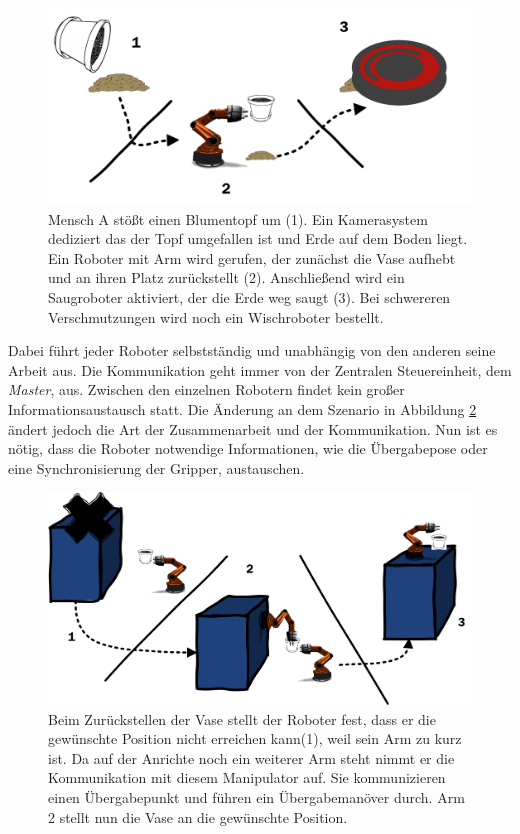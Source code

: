 \begin{figure}
	\centering
	\includegraphics[scale=1.4]{fig/szen1}   
	\caption[Beispiel Szenario 1]{Mensch A stößt einen Blumentopf um (1). Ein Kamerasystem dediziert das der Topf umgefallen ist und Erde auf dem Boden liegt. Ein Roboter mit Arm wird gerufen, der zunächst die Vase aufhebt und an ihren Platz zurückstellt (2). Anschließend wird ein Saugroboter aktiviert, der die Erde weg saugt (3). Bei schwereren Verschmutzungen wird noch ein Wischroboter bestellt.}
	\label{fig:szen1}
\end{figure}

Dabei führt jeder Roboter selbstständig  und unabhängig von den anderen seine Arbeit aus. Die Kommunikation geht immer von der Zentralen Steuereinheit, dem \textit{Master}, aus. Zwischen den einzelnen Robotern findet kein großer Informationsaustausch statt. Die Änderung an dem Szenario in Abbildung \ref{fig:szen2} ändert jedoch die Art der Zusammenarbeit und der Kommunikation. Nun ist es nötig, dass die Roboter notwendige Informationen, wie die Übergabepose oder eine Synchronisierung der Gripper, austauschen.

\begin{figure}
	\centering
	\includegraphics[scale=1.0]{fig/szen2}   
	\caption[Erweiterung Szenario 1]{Beim Zurückstellen der Vase stellt der Roboter fest, dass er die gewünschte Position nicht erreichen kann(1), weil sein Arm zu kurz ist. Da auf der Anrichte noch ein weiterer Arm steht nimmt er die Kommunikation mit diesem Manipulator auf. Sie kommunizieren einen Übergabepunkt und führen ein Übergabemanöver durch. Arm 2 stellt nun die Vase an die gewünschte Position.
	}
	\label{fig:szen2}
\end{figure}


